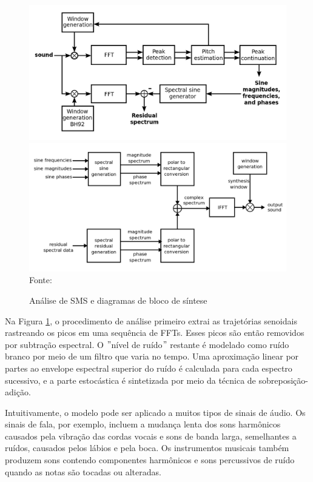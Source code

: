 \begin{figure}[!htb]
   \centering
   \caption{Análise de SMS e diagramas de bloco de síntese}\label{fig:smsProcesso} 
   \includegraphics[scale=0.18]{figuras/sms.png}
   \includegraphics[scale=0.18]{figuras/sms2.png}
   \\Fonte: \cite{bonada2001}
\end{figure}

Na Figura \ref{fig:smsProcesso}, o procedimento de análise primeiro extrai as trajetórias senoidais rastreando os picos em uma sequência de FFTs. Esses picos são então removidos por subtração espectral. O $"$nível de ruído$"$ restante é modelado como ruído branco por meio de um filtro que varia no tempo. Uma aproximação linear por partes ao envelope espectral superior do ruído é calculada para cada espectro sucessivo, e a parte estocástica é sintetizada por meio da técnica de sobreposição-adição.

Intuitivamente, o modelo pode ser aplicado a muitos tipos de sinais de áudio. Os sinais de fala, por exemplo, incluem a mudança lenta dos sons harmônicos causados pela vibração das cordas vocais e sons de banda larga, semelhantes a ruídos, causados pelos lábios e pela boca. Os instrumentos musicais também produzem sons contendo componentes harmônicos e sons percussivos de ruído quando as notas são tocadas ou alteradas.

